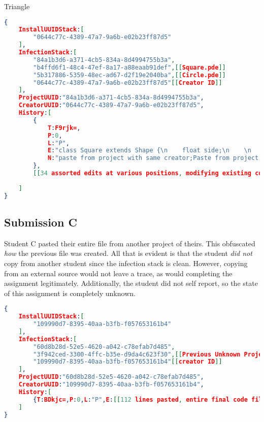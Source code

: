 \documentclass[12pt,final,thesis,actual]{uhthesis}
\newcommand{\n}{\hfill\break}
\begin{document}
\pagebreak
Triangle
\begin{lstlisting}[language=json]
{
	InstallUUIDStack:[
		"0644c77c-4389-47a7-9a6b-e02b23ff87d5"
	],
	InfectionStack:[
		"84a1b3d6-a371-4cb5-834a-8d4994755b3a",
		"b4ffd6f1-48c4-47ef-8a17-a88eaab91def",[[Square.pde]]
		"5b317886-5359-48ec-ad67-d2f19e2040ba",[[Circle.pde]]
		"0644c77c-4389-47a7-9a6b-e02b23ff87d5"[[Creator ID]]
	],
	ProjectUUID:"84a1b3d6-a371-4cb5-834a-8d4994755b3a",
	CreatorUUID:"0644c77c-4389-47a7-9a6b-e02b23ff87d5",
	History:[
		{
			T:F9rjk=,
			P:0,
			L:"P",
			E:"class Square extends Shape {\n    float side;\n    \n    Square(float xPos, float yPos) {\n        side = random(height * 0.1);\n        x = xPos;\n        y = yPos;\n        vx = random(2, 7);\n        vy = random(2, 7);\n        colorOfShape = color(random(255), random(255), random(255));\n    }\n    \n    void drawShape() {\n        fill(colorOfShape);\n        square(x, y, side);\n    }\n}",
			N:"paste from project with same creator;Paste from project with UUID b4ffd6f1-48c4-47ef-8a17-a88eaab91def;"
		},
		[[34 assorted edits at various positions, modifying existing code, no copies or pastes]]
		
	]
}
\end{lstlisting}
\pagebreak
\subsection{Submission C}
Student C pasted their entire file from another project of theirs.  This obfuscated \textit{how} the previous file was created.  All that is evident is that the student \textit{did not} copy from another student since the infection stack is clean.  However, copying from an external source would not leave a trace, as would completing the assignment legitimately.  Additionally, the student did not self report, so the state of this assignment is completely unknown.
\begin{lstlisting}[language=json]
{
	InstallUUIDStack:[
		"109990d7-8395-40aa-b3fb-f057653161b4"
	],
	InfectionStack:[
		"60d8b28d-52e5-4620-a042-c78efab7d485",
		"3f942ced-3300-4ffc-b35e-d9da4c623f30",[[Previous Unknown Project]]
		"109990d7-8395-40aa-b3fb-f057653161b4"[[creator ID]]
	],
	ProjectUUID:"60d8b28d-52e5-4620-a042-c78efab7d485",
	CreatorUUID:"109990d7-8395-40aa-b3fb-f057653161b4",
	History:[
		{T:BDkjc=,P:0,L:"P",E:[[112 lines pasted, entire final code file]],N:"paste from project with same creator;Paste from project with UUID 3f942ced-3300-4ffc-b35e-d9da4c623f30;"}
	]
}
\end{lstlisting}
\pagebreak
\end{document}

